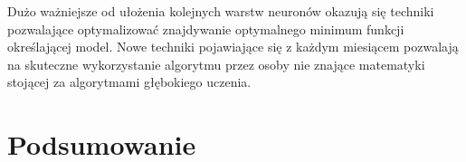 \documentclass[12pt,a4paper,twoside,titlepage,openright]{book}
\begin{document}
Dużo ważniejsze od ułożenia kolejnych warstw neuronów okazują się techniki pozwalające optymalizować znajdywanie optymalnego minimum funkcji określającej model. Nowe techniki pojawiające się z każdym miesiącem pozwalają na skuteczne wykorzystanie algorytmu przez osoby nie znające matematyki stojącej za algorytmami głębokiego uczenia.


\chapter*{Podsumowanie}


\listoffigures


\printbibliography
\end{document}
